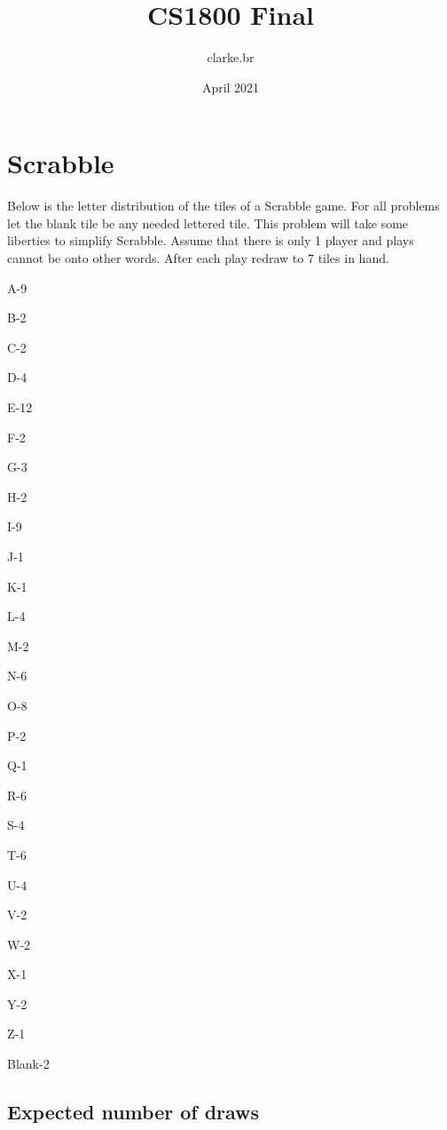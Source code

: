 \documentclass{article}
\title{CS1800 Final}
\author{clarke.br }
\date{April 2021}
\begin{document}
\maketitle

\section{Scrabble}

Below is the letter distribution of the tiles of a Scrabble game.  For all problems let the blank tile be any needed lettered tile. This problem will take some liberties to simplify Scrabble.  Assume that there is only 1 player and plays cannot be onto other words.  After each play redraw to 7 tiles in hand.

\begin{center}
    A-9
    
    B-2
    
    C-2
    
    D-4
    
    E-12
    
    F-2
    
    G-3
    
    H-2
    
    I-9
    
    J-1
    
    K-1
    
    L-4
    
    M-2
    
    N-6
    
    O-8
    
    P-2
    
    Q-1
    
    R-6
    
    S-4
    
    T-6
    
    U-4
    
    V-2
    
    W-2
    
    X-1
    
    Y-2
    
    Z-1
    
    Blank-2
    
\end{center}

\subsection{Expected number of draws}
\end{document}
